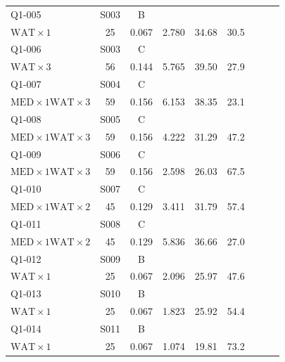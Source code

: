\documentclass[bwprint,fontset=fandol]{gmcmthesis}
\begin{document}
\begin{longtable}{@{}lcclrrrrr@{}}
    Q1-005 & S003 & B & \shortstack[l]{\strut $\mathrm{FOD}\times1$\quad $\mathrm{MED}\times1$\\\strut $\mathrm{WAT}\times1$} & 25 & 0.067 & 2.780 & 34.68 & 30.5 \\[3pt]
    Q1-006 & S003 & C & \shortstack[l]{\strut $\mathrm{FOD}\times1$\quad $\mathrm{HYG}\times1$\\\strut $\mathrm{WAT}\times3$} & 56 & 0.144 & 5.765 & 39.50 & 27.9 \\[3pt]
    Q1-007 & S004 & C & \shortstack[l]{\strut $\mathrm{FOD}\times1$\quad $\mathrm{HYG}\times1$\\\strut $\mathrm{MED}\times1$\quad $\mathrm{WAT}\times3$} & 59 & 0.156 & 6.153 & 38.35 & 23.1 \\[3pt]
    Q1-008 & S005 & C & \shortstack[l]{\strut $\mathrm{FOD}\times1$\quad $\mathrm{HYG}\times1$\\\strut $\mathrm{MED}\times1$\quad $\mathrm{WAT}\times3$} & 59 & 0.156 & 4.222 & 31.29 & 47.2 \\[3pt]
    Q1-009 & S006 & C & \shortstack[l]{\strut $\mathrm{FOD}\times1$\quad $\mathrm{HYG}\times1$\\\strut $\mathrm{MED}\times1$\quad $\mathrm{WAT}\times3$} & 59 & 0.156 & 2.598 & 26.03 & 67.5 \\[3pt]
    Q1-010 & S007 & C & \shortstack[l]{\strut $\mathrm{FOD}\times1$\quad $\mathrm{HYG}\times1$\\\strut $\mathrm{MED}\times1$\quad $\mathrm{WAT}\times2$} & 45 & 0.129 & 3.411 & 31.79 & 57.4 \\[3pt]
    Q1-011 & S008 & C & \shortstack[l]{\strut $\mathrm{FOD}\times1$\quad $\mathrm{HYG}\times1$\\\strut $\mathrm{MED}\times1$\quad $\mathrm{WAT}\times2$} & 45 & 0.129 & 5.836 & 36.66 & 27.0 \\[3pt]
    Q1-012 & S009 & B & \shortstack[l]{\strut $\mathrm{FOD}\times1$\quad $\mathrm{MED}\times1$\\\strut $\mathrm{WAT}\times1$} & 25 & 0.067 & 2.096 & 25.97 & 47.6 \\[3pt]
    Q1-013 & S010 & B & \shortstack[l]{\strut $\mathrm{FOD}\times1$\quad $\mathrm{MED}\times1$\\\strut $\mathrm{WAT}\times1$} & 25 & 0.067 & 1.823 & 25.92 & 54.4 \\[3pt]
    Q1-014 & S011 & B & \shortstack[l]{\strut $\mathrm{FOD}\times1$\quad $\mathrm{MED}\times1$\\\strut $\mathrm{WAT}\times1$} & 25 & 0.067 & 1.074 & 19.81 & 73.2 \\[3pt]

\end{longtable}
\end{document}
